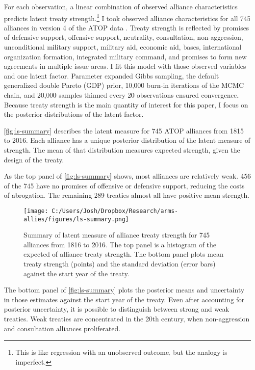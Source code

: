 \documentclass[12pt]{article}
\begin{document}
For each observation, a linear combination of observed alliance characteristics predicts latent treaty strength.\footnote{This is like regression with an unobserved outcome, but the analogy is imperfect.} 
I took observed alliance characteristics for all 745 alliances in version 4 of the ATOP data \citep{Leedsetal2002}. 
Treaty strength is reflected by promises of defensive support, offensive support, neutrality, consultation, non-aggression, unconditional military support, military aid, economic aid, bases, international organization formation, integrated military command, and promises to form new agreements in multiple issue areas. 
I fit this model with those observed variables and one latent factor.
Parameter expanded Gibbs sampling, the default generalized double Pareto (GDP) prior, 10,000 burn-in iterations of the MCMC chain, and 20,000 samples thinned every 20 observations ensured convergence. 
Because treaty strength is the main quantity of interest for this paper, I focus on the posterior distributions of the latent factor. 


\autoref{fig:ls-summary} describes the latent measure for 745 ATOP alliances from 1815 to 2016. 
Each alliance has a unique posterior distribution of the latent measure of strength. 
The mean of that distribution measures expected strength, given the design of the treaty.


As the top panel of \autoref{fig:ls-summary} shows, most alliances are relatively weak.
456 of the 745 have no promises of offensive or defensive support, reducing the costs of abrogation. 
The remaining 289 treaties almost all have positive mean strength. 


\begin{figure}
	\centering
		\texttt{[image: C:/Users/Josh/Dropbox/Research/arms-allies/figures/ls-summary.png]}
	\caption{Summary of latent measure of alliance treaty strength for 745 alliances from 1816 to 2016. The top panel is a histogram of the expected of alliance treaty strength. The bottom panel plots mean treaty strength (points) and the standard deviation (error bars) against the start year of the treaty.}
	\label{fig:ls-summary}
\end{figure}
	
	
The bottom panel of \autoref{fig:ls-summary} plots the posterior means and uncertainty in those estimates against the start year of the treaty. 
Even after accounting for posterior uncertainty, it is possible to distinguish between strong and weak treaties. 
Weak treaties are concentrated in the 20th century, when non-aggression and consultation alliances proliferated. 
\end{document}
